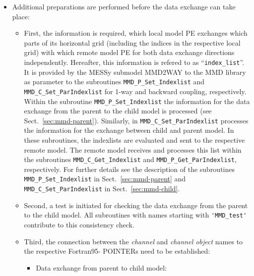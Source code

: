 \documentclass[twoside]{article}
\begin{document}
\begin{itemize}
\item
Additional preparations are performed before the data exchange can take place:
\begin{itemize}
\item First, the information is required, which local model PE exchanges which 
parts of its horizontal grid (including the indices in the respective
 local grid) with which remote model PE for both data exchange
 directions independently.
Hereafter, this information is refered to as ``\verb|index_list|''. It is
 provided by the MESSy submodel MMD2WAY to the MMD library as parameter to the 
subroutines \verb|MMD_P_Set_Indexlist|
 and \verb|MMD_C_Set_ParIndexlist| for 1-way and backward coupling,
 respectively. 
 Within the subroutine \verb|MMD_P_Set_Indexlist| the information for the
 data exchange from the parent to the child model is processed (see
 Sect.\ \ref{sec:mmd-parent}). Similarly,
 in \verb|MMD_C_Set_ParIndexlist| processes the information for the exchange
 between child and parent model.
 In these subroutines, the indexlists are evaluated and sent to the
 respective remote model. The remote model receives and processes 
this list within the subroutines \verb|MMD_C_Get_Indexlist|
 and \verb|MMD_P_Get_ParIndexlist|, respectively. 
For further details see the description of the subroutines 
\verb|MMD_P_Set_Indexlist| in Sect.\ \ref{sec:mmd-parent}
 and \verb|MMD_C_Set_ParIndexlist| in Sect.\ \ref{sec:mmd-child}. 
\item Second, a test is initiated for checking the data exchange from
the parent to the child model. All subroutines with names starting
with \verb|'MMD_test'| contribute to this consistency check. 
\item Third, the connection between the {\it channel} and 
{\it channel object} names to the respective Fortran95-{\footnotesize
POINTER}s need to be established:
\begin{itemize}
\item Data exchange from parent to child model:
\begin{itemize}


\end{itemize}
\end{itemize}
\end{itemize}
\end{itemize}
\end{document}
